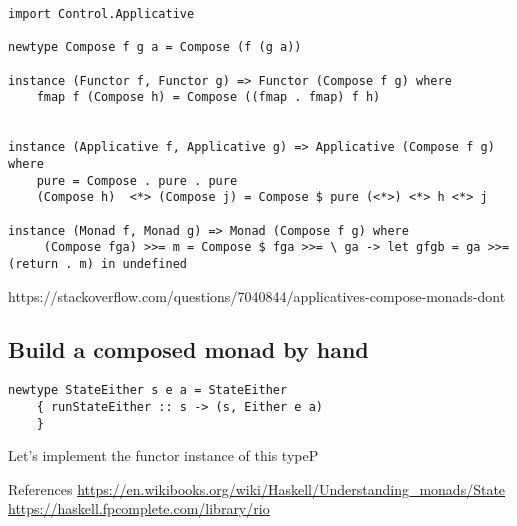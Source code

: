 \begin{verbatim}
import Control.Applicative

newtype Compose f g a = Compose (f (g a))

instance (Functor f, Functor g) => Functor (Compose f g) where
    fmap f (Compose h) = Compose ((fmap . fmap) f h)


instance (Applicative f, Applicative g) => Applicative (Compose f g) where
    pure = Compose . pure . pure
    (Compose h)  <*> (Compose j) = Compose $ pure (<*>) <*> h <*> j

instance (Monad f, Monad g) => Monad (Compose f g) where
     (Compose fga) >>= m = Compose $ fga >>= \ ga -> let gfgb = ga >>= (return . m) in undefined
\end{verbatim}

https://stackoverflow.com/questions/7040844/applicatives-compose-monads-dont


\subsection{Build a composed monad by hand}


\begin{verbatim}
newtype StateEither s e a = StateEither
    { runStateEither :: s -> (s, Either e a)
    }
\end{verbatim}

Let's implement the functor instance of this typeP


 References
 \url{https://en.wikibooks.org/wiki/Haskell/Understanding_monads/State}
 \url{https://haskell.fpcomplete.com/library/rio}
